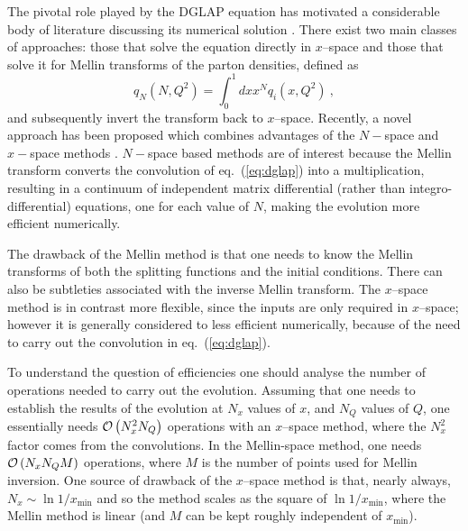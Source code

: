 \documentclass[12pt]{article}
\newcommand{\be}{\begin{equation}}
\newcommand{\ee}{\end{equation}}
\newcommand{\lp}{\left(}
\newcommand{\rp}{\right)}
\newcommand{\order}[1]{{\cal O}\left(#1\right)}
\newcommand{\AllDGLAP}{Botje,Schoeffel:1998tz,Pegasus,Pascaud:2001bi,Weinzierl:2002mv,coriano,GuzziThesis,nnpdf,Kosower:1997hg,Ratcliffe:2000kp}
\begin{document}
The pivotal role played by the DGLAP equation has motivated a
considerable body of literature discussing its numerical solution
\cite{\AllDGLAP}. There exist two main classes of approaches: those that
solve the equation directly in $x$--space and those that solve it for
Mellin transforms of the
parton densities, defined as
\be
q_{N}\lp N,Q^2\rp = \int_0^1 dx x^N q_i(x,Q^2) \ ,
\ee 
 and subsequently invert the transform back to
$x$--space.
 Recently, a novel approach has been proposed which combines
advantages of the $N-$space and $x-$space methods \cite{nnpdf}.
$N-$space based methods are of interest because the Mellin transform
converts the convolution of eq.~(\ref{eq:dglap}) into a multiplication,
resulting in a continuum of independent matrix differential (rather
than integro-differential) equations, one for each value of $N$,
making the evolution more efficient numerically.

The drawback of the Mellin method is that one needs to know the Mellin
transforms of both the splitting functions and the initial conditions.
There can also be subtleties associated with the inverse Mellin
transform.
%
The $x$--space method is in contrast more flexible, since the inputs
are only required in $x$--space; however it is generally considered to
less efficient numerically, because of the need to carry out the
convolution in eq.~(\ref{eq:dglap}).

To understand the question of efficiencies one should analyse the
number of operations needed to carry out the evolution. Assuming that
one needs to establish the results of the evolution at $N_x$ values of
$x$, and $N_Q$ values of $Q$, one essentially needs $\order{N_x^2
  N_Q}$ operations with an $x$--space method, where the $N_x^2$ factor
comes from the convolutions. In the Mellin-space method, one needs
$\order{N_x N_Q M}$ operations, where $M$ is the number of points used
for Mellin inversion. One source of drawback of the $x$--space method
is that, nearly always, $N_x \sim \ln 1/x_{\min}$ and so the method
scales as the square of $\ln 1/x_{\min}$, where the Mellin method is
linear (and $M$ can be kept roughly independent of $x_{\min}$). 
%
\end{document}
